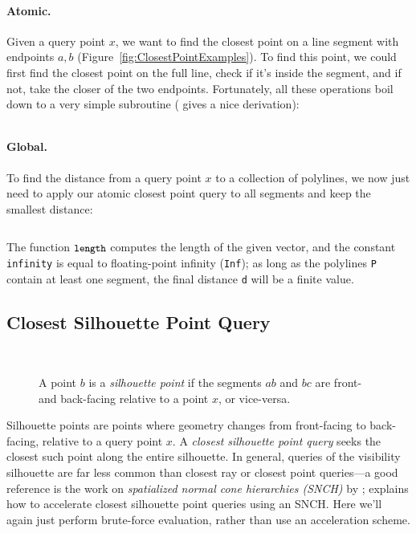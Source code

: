\documentclass{article}
\newcommand{\code}[1]{\texttt{\small{#1}}}
\renewcommand{\vec}[1]{#1}
\begin{document}
\paragraph{Atomic.} Given a query point \(\vec{x}\), we want to find the closest point on a line segment with endpoints \(\vec{a}, \vec{b}\) (Figure~\ref{fig:ClosestPointExamples}).  To find this point, we could first find the closest point on the full line, check if it's inside the segment, and if not, take the closer of the two endpoints.  Fortunately, all these operations boil down to a very simple subroutine (\citet{Quilez:2020:SLS} gives a nice derivation):

\inputminted[fontsize=\small,linenos,firstline=36,lastline=41,bgcolor=bg]{cpp}{../code/WoStLaplace2D.cpp}

\paragraph{Global.} To find the distance from a query point \(x\) to a collection of polylines, we now just need to apply our atomic closest point query to all segments and keep the smallest distance:

\inputminted[fontsize=\small,linenos,firstline=65,lastline=75,bgcolor=bg]{cpp}{../code/WoStLaplace2D.cpp}
The function \(\code{length}\) computes the length of the given vector, and the constant \code{infinity} is equal to floating-point infinity (\code{Inf}); as long as the polylines \code{P} contain at least one segment, the final distance \code{d} will be a finite value.

\subsection{Closest Silhouette Point Query}
\label{sec:ClosestSilhouettePointQuery}

\begin{figure}[h!]
   \centering
    \(\qquad\)
    \(\qquad\)
   
   \caption{A point \(\vec{b}\) is a \emph{silhouette point} if the segments \(\vec{a}\vec{b}\) and \(\vec{b}\vec{c}\) are front- and back-facing relative to a point \(\vec{x}\), or vice-versa.}
\end{figure}

Silhouette points are points where geometry changes from front-facing to back-facing, relative to a query point \(\vec{x}\).  A \emph{closest silhouette point query} seeks the closest such point along the entire silhouette.  In general, queries of the visibility silhouette are far less common than closest ray or closest point queries---a good reference is the work on \emph{spatialized normal cone hierarchies (SNCH)} by \citet{johnson2001spatialized}; \citet[Section 5.1]{Sawhney:2023:WoSt} explains how to accelerate closest silhouette point queries using an SNCH.  Here we'll again just perform brute-force evaluation, rather than use an acceleration scheme.
\end{document}
